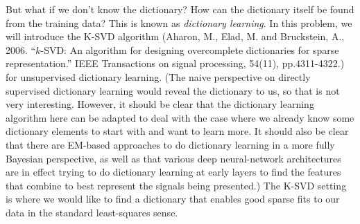 \documentclass[preview]{standalone}
\begin{document}
But what if we don't know the dictionary? How can the dictionary
itself be found from the training data?  This is known as \textit{dictionary learning}. In this problem, we will introduce the K-SVD
algorithm (Aharon, M., Elad, M. and Bruckstein, A., 2006. ``$k$-SVD: An algorithm for designing overcomplete dictionaries for sparse representation.'' IEEE Transactions on signal processing, 54(11), pp.4311-4322.) for unsupervised dictionary learning. (The naive perspective
on directly supervised dictionary learning would reveal the dictionary
to us, so that is not very interesting. However, it should be clear
that the dictionary learning algorithm here can be adapted to deal
with the case where we already know some dictionary elements to start
with and want to learn more. It should also be clear that there are
EM-based approaches to do dictionary learning in a more fully Bayesian
perspective, as well as that various deep neural-network architectures are
in effect trying to do dictionary learning at early layers to find the
features that combine to best represent the signals being presented.) The K-SVD setting is where we would like
to find a dictionary that enables good sparse fits to our data in the standard
least-squares sense.  
\end{document}
